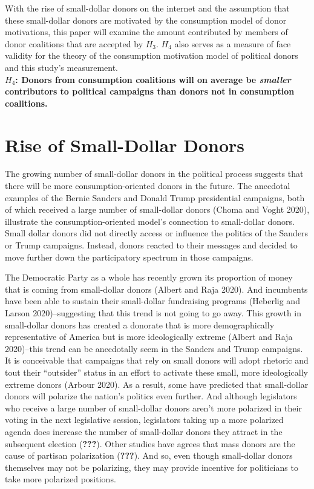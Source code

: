 \documentclass[12pt,]{article}
\begin{document}
With the rise of small-dollar donors on the internet and the assumption
that these small-dollar donors are motivated by the consumption model of
donor motivations, this paper will examine the amount contributed by
members of donor coalitions that are accepted by \(H_{3}\). \(H_{4}\)
also serves as a measure of face validity for the theory of the
consumption motivation model of political donors and this study's
measurement.\\
\textbf{\(H_{4}\): Donors from consumption coalitions will on average be
\emph{smaller} contributors to political campaigns than donors not in
consumption coalitions.}

\hypertarget{rise-of-small-dollar-donors}{%
\section{Rise of Small-Dollar
Donors}\label{rise-of-small-dollar-donors}}

The growing number of small-dollar donors in the political process
suggests that there will be more consumption-oriented donors in the
future. The anecdotal examples of the Bernie Sanders and Donald Trump
presidential campaigns, both of which received a large number of
small-dollar donors (Choma and Voght 2020), illustrate the
consumption-oriented model's connection to small-dollar donors. Small
dollar donors did not directly access or influence the politics of the
Sanders or Trump campaigns. Instead, donors reacted to their messages
and decided to move further down the participatory spectrum in those
campaigns.

The Democratic Party as a whole has recently grown its proportion of
money that is coming from small-dollar donors (Albert and Raja 2020).
And incumbents have been able to sustain their small-dollar fundraising
programs (Heberlig and Larson 2020)--suggesting that this trend is not
going to go away. This growth in small-dollar donors has created a
donorate that is more demographically representative of America but is
more ideologically extreme (Albert and Raja 2020)--this trend can be
anecdotally seem in the Sanders and Trump campaigns. It is conceivable
that campaigns that rely on small donors will adopt rhetoric and tout
their ``outsider'' status in an effort to activate these small, more
ideologically extreme donors (Arbour 2020). As a result, some have
predicted that small-dollar donors will polarize the nation's politics
even further. And although legislators who receive a large number of
small-dollar donors aren't more polarized in their voting in the next
legislative session, legislators taking up a more polarized agenda does
increase the number of small-dollar donors they attract in the
subsequent election ({\textbf{???}}). Other studies have agrees that
mass donors are the cause of partisan polarization ({\textbf{???}}). And
so, even though small-dollar donors themselves may not be polarizing,
they may provide incentive for politicians to take more polarized
positions.
\end{document}

